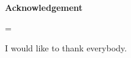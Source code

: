\cleardoublepage
\thispagestyle{empty}
\vspace*{\fill}
\centerline{\large\bfseries Acknowledgement}
\nobreak
\vspace{1pc}
\begingroup\small
{}\textwidth
\rightskip=\leftskip

I would like to thank everybody.

\par\endgroup
\vspace{\fill}
\clearpage
